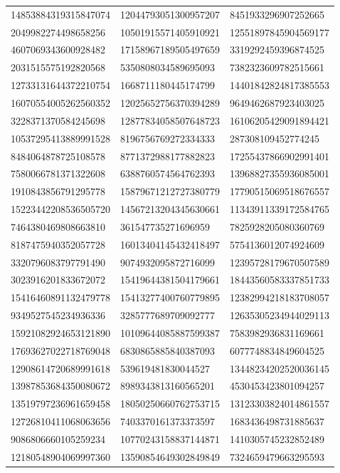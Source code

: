 \begin{longtable}{*{3}{l}}
14853884319315847074&12044793051300957207&8451933296907252665\\
2049982274498658256&10501915571405910921&12551897845904569177\\
4607069343600928482&17158967189505497659&3319292459396874525\\
2031515575192820568&5350808034589695093&7382323609782515661\\
12733131644372210754&1668711180445174799&14401842824817385553\\
16070554005262560352&12025652756370394289&9649462687923403025\\
3228371370584245698&12877834058507648723&16106205429091894421\\
10537295413889991528&8196756769272334333&287308109452774245\\
8484064878725108578&8771372988177882823&17255437866902991401\\
7580066781371322608&6388760574564762393&13968827355936085001\\
1910843856791295778&15879671212727380779&17790515069518676557\\
15223442208536505720&14567213204345630661&11343911339172584765\\
7464380469808663810&361547735271696959&7825928205080360769\\
8187475940352057728&16013404145432418497&5754136012074924609\\
3320796083797791490&9074932095872716099&12395728179670507589\\
3023916201833672072&15419644381504179661&18443560583337851733\\
15416460891132479778&15413277400760779895&12382994218183708057\\
9349527545234936336&3285777689709092777&12635305234944029113\\
15921082924653121890&10109644085887599387&7583982936831169661\\
17693627022718769048&6830865885840387093&6077748834849604525\\
12908614720689991618&539619481830044527&13448234202520036145\\
13987853684350080672&8989343813160565201&4530453423801094257\\
13519797236961659458&18050250660762753715&13123303824014861557\\
12726810411068063656&7403370161373373597&1683436498731885637\\
9086806660105259234&10770243158837144871&1410305745232852489\\
12180548904069997360&13590854649302849849&7324659479663295593\\

\end{longtable}
